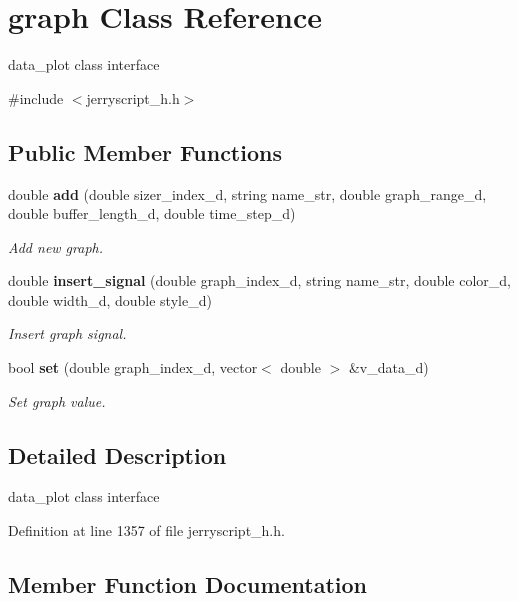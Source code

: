 \section{graph Class Reference}
\label{classgraph}


data\+\_\+plot class interface  




{\ttfamily \#include $<$jerryscript\+\_\+h.\+h$>$}

\subsection*{Public Member Functions}
\begin{DoxyCompactItemize}
\item 
double \textbf{ add} (double sizer\+\_\+index\+\_\+d, string name\+\_\+str, double graph\+\_\+range\+\_\+d, double buffer\+\_\+length\+\_\+d, double time\+\_\+step\+\_\+d)
\begin{DoxyCompactList}\small\item\em Add new graph. \end{DoxyCompactList}\item 
double \textbf{ insert\+\_\+signal} (double graph\+\_\+index\+\_\+d, string name\+\_\+str, double color\+\_\+d, double width\+\_\+d, double style\+\_\+d)
\begin{DoxyCompactList}\small\item\em Insert graph signal. \end{DoxyCompactList}\item 
bool \textbf{ set} (double graph\+\_\+index\+\_\+d, vector$<$ double $>$ \&v\+\_\+data\+\_\+d)
\begin{DoxyCompactList}\small\item\em Set graph value. \end{DoxyCompactList}\end{DoxyCompactItemize}


\subsection{Detailed Description}
data\+\_\+plot class interface 

Definition at line 1357 of file jerryscript\+\_\+h.\+h.



\subsection{Member Function Documentation}
\mbox{\label{classgraph_a50d78ce95b49dcfbfe3543a1d66480a5}} 
